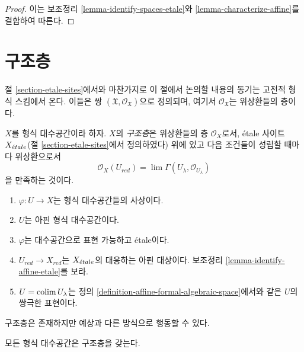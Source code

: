 \begin{proof}
이는 보조정리 \ref{lemma-identify-spaces-etale}와
\ref{lemma-characterize-affine}를 결합하여 따른다.
\end{proof}

\section{구조층}
\label{section-structure-sheaf}


\noindent
절 \ref{section-etale-sites}에서와 마찬가지로 이 절에서 논의할 내용의
동기는 고전적 형식 스킴에서 온다. 이들은 쌍
$(\mathfrak X, \mathcal{O}_\mathfrak X)$으로 정의되며,
여기서 $\mathcal{O}_\mathfrak X$는 위상환들의 층이다.

\medskip\noindent
$X$를 형식 대수공간이라 하자. $X$의 {\it 구조층}은
위상환들의 층 $\mathcal{O}_X$로서, \'etale 사이트
$X_{\acute{e}tale}$(절 \ref{section-etale-sites}에서 정의하였다) 위에 있고 다음 조건들이
성립할 때마다 위상환으로서
$$
\mathcal{O}_X(U_{red}) = \lim \Gamma(U_\lambda, \mathcal{O}_{U_\lambda})
$$
을 만족하는 것이다.
\begin{enumerate}
\item $\varphi : U \to X$는 형식 대수공간들의 사상이다.
\item $U$는 아핀 형식 대수공간이다.
\item $\varphi$는 대수공간으로 표현 가능하고 \'etale이다.
\item $U_{red} \to X_{red}$는 $X_{\acute{e}tale}$의 대응하는 아핀 대상이다.
보조정리 \ref{lemma-identify-affine-etale}를 보라.
\item $U = \mathop{\mathrm{colim}}\nolimits U_\lambda$는 정의
\ref{definition-affine-formal-algebraic-space}에서와 같은 $U$의
쌍극한 표현이다.
\end{enumerate}
구조층은 존재하지만 예상과 다른 방식으로 행동할 수 있다.

\begin{lemma}
\label{lemma-structure-sheaf}
모든 형식 대수공간은 구조층을 갖는다.
\end{lemma}

